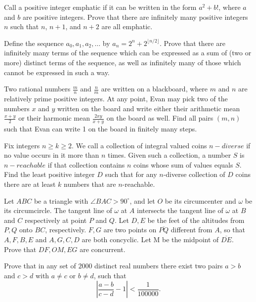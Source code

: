 \documentclass[11pt]{scrartcl}
\begin{document}
\begin{problem}[8807076875709895728]
Call a positive integer emphatic if it can be written in the form $a^2+b!$, where $a$ and $b$ are positive integers. Prove that there are infinitely many positive integers $n$ such that $n$, $n+1$, and $n+2$ are all emphatic.
\end{problem}
\begin{problem}[8609709793627283757]
	Define the sequence $a_0,a_1,a_2,\hdots$ by $a_n=2^n+2^{\lfloor n/2\rfloor}$. Prove that there are infinitely many terms of the sequence which can be expressed as a sum of (two or more) distinct terms of the sequence, as well as infinitely many of those which cannot be expressed in such a way.
\end{problem}
\begin{problem}[545015136325290]
	Two rational numbers \(\tfrac{m}{n}\) and \(\tfrac{n}{m}\) are written on a blackboard, where \(m\) and \(n\) are relatively prime positive integers. At any point, Evan may pick two of the numbers \(x\) and \(y\) written on the board and write either their arithmetic mean \(\tfrac{x+y}{2}\) or their harmonic mean \(\tfrac{2xy}{x+y}\) on the board as well. Find all pairs \((m,n)\) such that Evan can write 1 on the board in finitely many steps.
\end{problem}
\begin{problem}[267446035349026955]
	Fix integers $n\ge k\ge 2$. We call a collection of integral valued coins $n-diverse$ if no value occurs in it more than $n$ times. Given such a collection, a number $S$ is $n-reachable$ if that collection contains $n$ coins whose sum of values equals $S$. Find the least positive integer $D$ such that for any $n$-diverse collection of $D$ coins there are at least $k$ numbers that are $n$-reachable.
\end{problem}
\begin{problem}[571373387028298]
Let $ABC$ be a triangle with $\angle BAC > 90 ^{\circ}$, and let $O$ be its circumcenter and $\omega$ be its circumcircle. The tangent line of $\omega$ at $A$ intersects the tangent line of $\omega$ at $B$ and $C$ respectively at point $P$ and $Q$. Let $D,E$ be the feet of the altitudes from $P,Q$ onto $BC$, respectively. $F,G$ are two points on $\overline{PQ}$ different from $A$, so that $A,F,B,E$ and $A,G,C,D$ are both concyclic. Let M be the midpoint of $\overline{DE}$. Prove that $DF,OM,EG$ are concurrent.
\end{problem}
\begin{problem}[158732792334122]
	Prove that in any set of $2000$ distinct real numbers there exist two pairs $a>b$ and $c>d$ with $a \neq c$ or $b \neq d $, such that\[ \left| \frac{a-b}{c-d} - 1 \right|< \frac{1}{100000}. \]
\end{problem}
\end{document}
